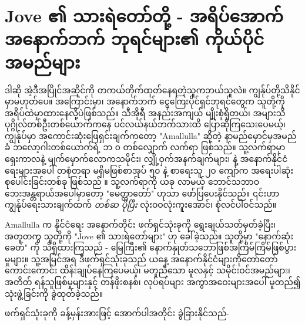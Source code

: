 \documentclass[10pt,twocolumn,letterpaper]{article}
\begin{document}
\section{Jove ၏ သားရဲတော်တို့ - အရိပ်အောက် အနောက်ဘက် ဘုရင်များ၏ ကိုယ်ပိုင်အမည်များ}

ဒါဆို အဲ့ဒီအပြိုင်အဆိုင်ကို တကယ်တိုက်ထုတ်နေရတဲ့သူကဘယ်သူလဲ။ ကျွန်ုပ်တို့သိနိုင်မှာမဟုတ်ပေ။ အကြောင်းမှာ၊ အနောက်ဘက် ငွေကြေးပိုင်ရှင်ဘုရင်တွေက သူတို့ကို အရိပ်ထဲမှာထားနေလို့ပဲဖြစ်သည်။ သီအိုရီ အနည်းအကျယ် မျိုးစုံရှိတယ်၊ အများသိပုဂ္ဂိုလ်တစ်ဦးတစ်ယောက်ကနေ ပင်လယ်နယ်ဘက်သားထိ ပြောဆိုကြသေးပေမယ့်၊ ကျွန်ုပ်မှာ အကောင်းဆုံးဖြေရှင်းချက်ကတော့ "Amallulla" ဆိုတဲ့ နာမည်မှောင်မှအမည်ခံ ဘလော့ဂါးတစ်ယောက်ရဲ့ ဘ ၀ တစ်လျှောက် လက်ရာ ဖြစ်သည်။ သူ့လက်ရာမှာ ရှေးကာလနဲ့ မျက်မှောက်လောကသမိုင်း၊ လျှို့ဝှက်အနက်ချက်များ၊ နဲ့ အနောက်နိုင်ငံရေးများအပေါ် တစုံတရာ မရှိမဖြစ်စာအုပ် ၅၀ နဲ့ စာရေးသူ ၂၀ ကျော်က အရေးပါဆုံး စုပေါင်းခြင်းတစ်ခု ဖြစ်သည် \cite{33,34}။ သူ့လက်ရာကို ယခု လာမယ့် ဘောင်သဘာဝဘေးအန္တရာယ်အပေါ်မှာတော့ "မေတ္တာတော်" ဟုသာ ဖော်ပြပေးနိုင်သည်။ ၎င်းဟာ ကျွန်ုပ်ရေးသားချက်ထက် \textit{တစ်ဆ ပိုပြီး} လုံးဝဝလုံးကူးအောင်၊ စုံလင်ပါဝင်သည်။

Amallulla က နိုင်ငံရေး အနောက်တိုင်း ဖက်ရှင်သုံးခုကို ရွေးချယ်သတ်မှတ်ခဲ့ပြီး၊ အတူတကွ သူတို့ကို "Jove ၏ သားရဲတော်များ" ဟု ခေါ်ခဲ့သည်။ သူတို့မှာ "နောက်ဆုံးခေတ်" ကို သိရှိထားကြသည် - မြေကြီး၏ နောက်နှုတ်သဘောဖြစ်အကြိမ်ကြိမ်ဖြစ်ပွားမှုများ။ သူ့အမြင်အရ ဒီဖက်ရှင်သုံးခုသည် ယနေ့ အနောက်နိုင်ငံများကိုတော်တော်ကောင်းကောင်း ထိန်းချုပ်နေကြပေမယ့်၊ မတူညီသော မူလနှင့် သမိုင်းဝင်အမည်များ၊ အတိတ် ရန်သူဖြစ်မှုများနှင့် တန်ဖိုးစနစ်၊ လုပ်ရပ်များ အကွာအဝေးများအပေါ် မူတည်၍ သုံးဖွဲ့ခြင်းကို ခွဲထုတ်ခဲ့သည်။

ဖက်ရှင်သုံးခုကို ခန့်မှန်းအားဖြင့် အောက်ပါအတိုင်း ခွဲခြားနိုင်သည်-
\end{document}

